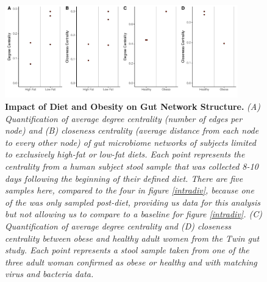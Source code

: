 \documentclass[12pt,]{article}
\begin{document}
\newpage

\begin{figure}[htbp]
\centering
\includegraphics[width=0.90000\textwidth]{../figures/dietnetworks.pdf}
\caption{\textbf{Impact of Diet and Obesity on Gut Network Structure.}
\emph{(A) Quantification of average degree centrality (number of edges
per node) and (B) closeness centrality (average distance from each node
to every other node) of gut microbiome networks of subjects limited to
exclusively high-fat or low-fat diets. Each point represents the
centrality from a human subject stool sample that was collected 8-10
days following the beginning of their defined diet. There are five
samples here, compared to the four in figure \ref{intradiv}, because one
of the was only sampled post-diet, providing us data for this analysis
but not allowing us to compare to a baseline for figure \ref{intradiv}.
(C) Quantification of average degree centrality and (D) closeness
centrality between obese and healthy adult women from the Twin gut
study. Each point represents a stool sample taken from one of the three
adult woman confirmed as obese or healthy and with matching virus and
bacteria data.} \label{dietnetworks}}
\end{figure}
\end{document}
